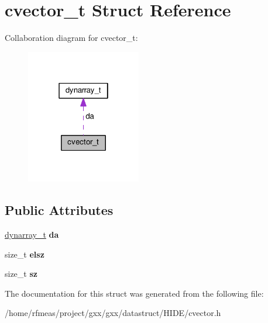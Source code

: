 \hypertarget{structcvector__t}{}\section{cvector\+\_\+t Struct Reference}
\label{structcvector__t}


Collaboration diagram for cvector\+\_\+t\+:
\nopagebreak
\begin{figure}[H]
\begin{center}
\leavevmode
\includegraphics[width=142pt]{structcvector__t__coll__graph}
\end{center}
\end{figure}
\subsection*{Public Attributes}
\begin{DoxyCompactItemize}
\item 
\hyperlink{structdynarray__t}{dynarray\+\_\+t} {\bfseries da}\hypertarget{structcvector__t_a57787c5295a7fb99662be920235c14fc}{}\label{structcvector__t_a57787c5295a7fb99662be920235c14fc}

\item 
size\+\_\+t {\bfseries elsz}\hypertarget{structcvector__t_a5fbe091cf3647b5f6534fbc69529c1a8}{}\label{structcvector__t_a5fbe091cf3647b5f6534fbc69529c1a8}

\item 
size\+\_\+t {\bfseries sz}\hypertarget{structcvector__t_a07cb708e3aad0103fb99cf8baab92aa1}{}\label{structcvector__t_a07cb708e3aad0103fb99cf8baab92aa1}

\end{DoxyCompactItemize}


The documentation for this struct was generated from the following file\+:\begin{DoxyCompactItemize}
\item 
/home/rfmeas/project/gxx/gxx/datastruct/\+H\+I\+D\+E/cvector.\+h\end{DoxyCompactItemize}
